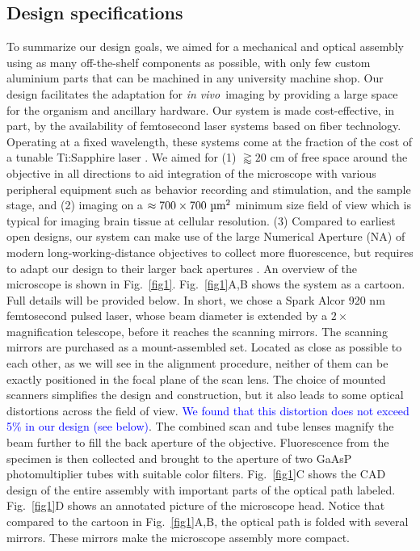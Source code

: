 \documentclass[10pt,letterpaper]{article}
\newcommand{\invivo}{\textit{in vivo}~}
\begin{document}
\subsection*{Design specifications}
To summarize our design goals, we aimed for a mechanical and optical assembly using as many off-the-shelf components as possible, with only few custom aluminium parts that can be machined in any university machine shop. Our design  facilitates the adaptation for \invivo imaging by providing a large space for the organism and ancillary hardware. Our system is made cost-effective, in part, by the availability of femtosecond laser systems based on fiber technology. Operating at a fixed wavelength, these systems come at the fraction of the cost of a tunable Ti:Sapphire laser \cite{Bueno2019}.\newline
We aimed for (1) $\gtrapprox20\text{ cm}$ of free space around the objective in all directions to aid integration of the microscope with various peripheral equipment such as behavior recording and stimulation, and the sample stage, and (2) imaging on a  $\approx 700\times 700\text{ \textmu m}^2$ minimum size field of view which is typical for imaging brain tissue at cellular resolution. (3) Compared to earliest open designs\cite{Rosenegger2014, Mayrhofer2015}, our system can make use of the large Numerical Aperture (NA) of  modern long-working-distance objectives to collect more fluorescence, but requires to adapt our design to their larger back apertures \cite{Janelia2024}.\newline
An overview of the microscope is shown in Fig.~\ref{fig1}. Fig.~\ref{fig1}A,B shows the system as a cartoon. Full details will be provided below. In short, we chose a Spark Alcor 920 nm femtosecond pulsed laser, whose beam diameter is  extended by a $2\times$ magnification telescope, before it reaches the scanning mirrors. The scanning mirrors are purchased as a mount-assembled set. Located as close as possible to each other, as we will see in the alignment procedure, neither of them can be exactly positioned in the focal plane of the scan lens. The choice of mounted scanners simplifies the design and construction, but it also leads to some optical distortions across the field of view. \textcolor{blue}{We found that this distortion does not exceed 5\% in our design (see below)}. The combined scan and tube lenses magnify the beam further to fill the back aperture of the objective. Fluorescence from the specimen is then collected and brought to the aperture of two GaAsP photomultiplier tubes with suitable color filters. Fig.~\ref{fig1}C shows the CAD design of the entire assembly with important parts of the optical path labeled. Fig.~\ref{fig1}D shows an annotated picture of the microscope head. Notice that compared to the cartoon in Fig.~\ref{fig1}A,B, the optical path is folded with several mirrors. These mirrors make the microscope assembly more compact.
\end{document}

